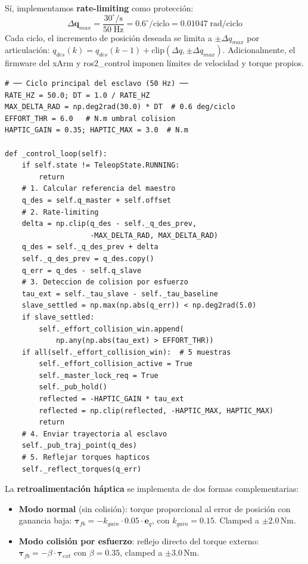 \documentclass[journal,10pt,twoside]{IEEEtran}
\begin{document}
Sí, implementamos \textbf{rate-limiting} como protección:
\[
  \Delta\bm{q}_{max} = \frac{30^\circ/\text{s}}{50\;\text{Hz}} = 0{.}6^\circ/\text{ciclo} = 0{.}01047\;\text{rad/ciclo}
\]
Cada ciclo, el incremento de posición deseada se limita a
$\pm\Delta q_{max}$ por articulación:
$q_{des}(k)=q_{des}(k-1)+\text{clip}(\Delta q, \pm\Delta q_{max})$.
Adicionalmente, el firmware del xArm y ros2\_control imponen límites
de velocidad y torque propios.

\begin{lstlisting}[caption={Ciclo de control del robot Esclavo (extracto de bilateral\_teleop.py)},
                   label={lst:slave}]
# ── Ciclo principal del esclavo (50 Hz) ──
RATE_HZ = 50.0; DT = 1.0 / RATE_HZ
MAX_DELTA_RAD = np.deg2rad(30.0) * DT  # 0.6 deg/ciclo
EFFORT_THR = 6.0   # N.m umbral colision
HAPTIC_GAIN = 0.35; HAPTIC_MAX = 3.0  # N.m

def _control_loop(self):
    if self.state != TeleopState.RUNNING:
        return
    # 1. Calcular referencia del maestro
    q_des = self.q_master + self.offset
    # 2. Rate-limiting
    delta = np.clip(q_des - self._q_des_prev,
                    -MAX_DELTA_RAD, MAX_DELTA_RAD)
    q_des = self._q_des_prev + delta
    self._q_des_prev = q_des.copy()
    q_err = q_des - self.q_slave
    # 3. Deteccion de colision por esfuerzo
    tau_ext = self._tau_slave - self._tau_baseline
    slave_settled = np.max(np.abs(q_err)) < np.deg2rad(5.0)
    if slave_settled:
        self._effort_collision_win.append(
            np.any(np.abs(tau_ext) > EFFORT_THR))
    if all(self._effort_collision_win):  # 5 muestras
        self._effort_collision_active = True
        self._master_lock_req = True
        self._pub_hold()
        reflected = -HAPTIC_GAIN * tau_ext
        reflected = np.clip(reflected, -HAPTIC_MAX, HAPTIC_MAX)
        return
    # 4. Enviar trayectoria al esclavo
    self._pub_traj_point(q_des)
    # 5. Reflejar torques hapticos
    self._reflect_torques(q_err)
\end{lstlisting}

La \textbf{retroalimentación háptica} se implementa de dos formas
complementarias:

\begin{itemize}
  \item \textbf{Modo normal} (sin colisión): torque proporcional al
        error de posición con ganancia baja:
        $\bm{\tau}_{fb}=-k_{gain}\cdot 0{.}05\cdot\bm{e}_q$,
        con $k_{gain}=0{.}15$. Clamped a $\pm2{.}0$\,Nm.
  \item \textbf{Modo colisión por esfuerzo}: reflejo directo del torque
        externo: $\bm{\tau}_{fb}=-\beta\cdot\bm{\tau}_{ext}$ con
        $\beta=0{.}35$, clamped a $\pm3{.}0$\,Nm.
\end{itemize}
\end{document}
